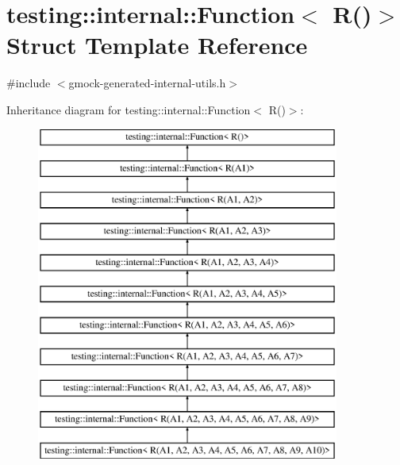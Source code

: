 \hypertarget{structtesting_1_1internal_1_1_function_3_01_r_07_08_4}{}\section{testing\+::internal\+::Function$<$ R()$>$ Struct Template Reference}
\label{structtesting_1_1internal_1_1_function_3_01_r_07_08_4}


{\ttfamily \#include $<$gmock-\/generated-\/internal-\/utils.\+h$>$}

Inheritance diagram for testing\+::internal\+::Function$<$ R()$>$\+:\begin{figure}[H]
\begin{center}
\leavevmode
\includegraphics[height=11.000000cm]{d5/ddb/structtesting_1_1internal_1_1_function_3_01_r_07_08_4}
\end{center}
\end{figure}
